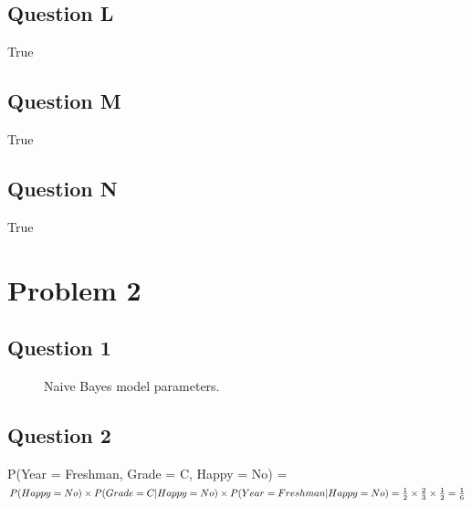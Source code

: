 \documentclass[12pt]{article} %
\begin{document}
\subsection{Question L}
True
\subsection{Question M}
True
\subsection{Question N}
True

\section{Problem 2}
\subsection{Question 1}

\begin{figure}[H]
	\vspace{-10mm}
	\caption{Naive Bayes model parameters.}
\end{figure}

\subsection{Question 2}
P(Year = Freshman, Grade = C, Happy = No) =\\ $P(Happy = No) \times P(Grade = C|Happy = No) \times P(Year = Freshman| Happy = No)=\\
\frac{1}{2} \times \frac{2}{3} \times \frac{1}{2} = \frac{1}{6}$
\end{document}
